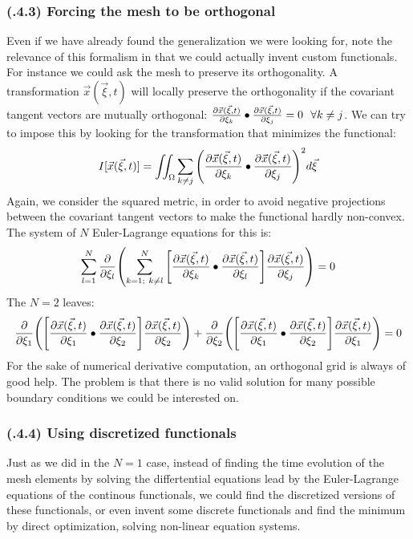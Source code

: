 \documentclass[11pt, a4paper]{article} %
\begin{document}
\subsubsection*{\bf (\textgamma.4.3) Forcing the mesh to be orthogonal}
Even if we have already found the generalization we were looking for, note the relevance of this formalism in that we could actually invent custom functionals. For instance we could ask the mesh to preserve its orthogonality. A transformation $\vec{x}(\vec{\xi},t)$ will locally preserve the orthogonality if the covariant tangent vectors are mutually orthogonal: $\pdv{\vec{x}(\vec{\xi},t)}{\xi_k}\bullet \pdv{\vec{x}(\vec{\xi},t)}{\xi_j}=0\ \ \forall k\neq j$. We can try to impose this by looking for the transformation that minimizes the functional:
\begin{equation}
I[\vec{x}(\vec{\xi},t)]=\iint_\Omega \sum_{k\neq j} \qty(\pdv{\vec{x}(\vec{\xi},t)}{\xi_k}\bullet \pdv{\vec{x}(\vec{\xi},t)}{\xi_j})^2 d\vec{\xi}
\end{equation}
Again, we consider the squared metric, in order to avoid negative projections between the covariant tangent vectors to make the functional hardly non-convex.
The system of $N$ Euler-Lagrange equations for this is:
\begin{equation}
\sum_{l=1}^N \pdv{}{\xi_l}\qty( \sum_{k=1;\ k\neq l}^N \qty[\pdv{\vec{x}(\vec{\xi},t)}{\xi_k}\bullet \pdv{\vec{x}(\vec{\xi},t)}{\xi_l}] \pdv{\vec{x}(\vec{\xi},t)}{\xi_j}  )=0
\end{equation}
The $N=2$ leaves:
\begin{equation}
\pdv{}{\xi_1}\qty( \qty[\pdv{\vec{x}(\vec{\xi},t)}{\xi_1}\bullet \pdv{\vec{x}(\vec{\xi},t)}{\xi_2}] \pdv{\vec{x}(\vec{\xi},t)}{\xi_2}  )+\pdv{}{\xi_2}\qty( \qty[\pdv{\vec{x}(\vec{\xi},t)}{\xi_1}\bullet \pdv{\vec{x}(\vec{\xi},t)}{\xi_2}] \pdv{\vec{x}(\vec{\xi},t)}{\xi_1}  )=0
\end{equation}
For the sake of numerical derivative computation, an orthogonal grid is always of good help. The problem is that there is no valid solution for many possible boundary conditions we could be interested on.

\subsubsection*{\bf (\textgamma.4.4) Using discretized functionals}

Just as we did in the $N=1$ case, instead of finding the time evolution of the mesh elements by solving the differtential equations lead by the Euler-Lagrange equations of the continous functionals, we could find the discretized versions of these functionals, or even invent some discrete functionals and find the minimum by direct optimization, solving non-linear equation systems.
\end{document}
